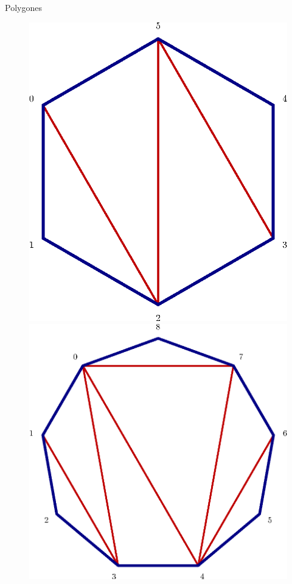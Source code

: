 \documentclass[french,xcolor=dvipsnames]{beamer}
\begin{document}
\begin{frame}{Polygones}
			\begin{figure}
				\includegraphics[scale=0.3]{exemple_6_rot.eps}\bigskip 
				\includegraphics[scale=0.3]{exemple_triangu_9.eps}
			\end{figure}
		\end{frame}
		
\end{document}
